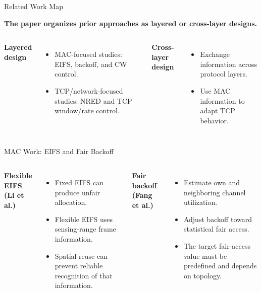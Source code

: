\ResearchStyle
{}

\begin{frame}{Related Work Map}
\begin{center}
\textbf{The paper organizes prior approaches as layered or cross-layer designs.}
\end{center}

\begin{columns}[T,onlytextwidth]
\textbf{Layered design}
\begin{itemize}
\item MAC-focused studies: EIFS, backoff, and CW control.
\item TCP/network-focused studies: NRED and TCP window/rate control.
\end{itemize}
\textbf{Cross-layer design}
\begin{itemize}
\item Exchange information across protocol layers.
\item Use MAC information to adapt TCP behavior.
\end{itemize}
\end{columns}

\vspace{0.25cm}
\end{frame}

\begin{frame}{MAC Work: EIFS and Fair Backoff}
\begin{columns}[T,onlytextwidth]
\textbf{Flexible EIFS (Li et al.)}
\begin{itemize}
\item Fixed EIFS can produce unfair allocation.
\item Flexible EIFS uses sensing-range frame information.
\item Spatial reuse can prevent reliable recognition of that information.
\end{itemize}
\textbf{Fair backoff (Fang et al.)}
\begin{itemize}
\item Estimate own and neighboring channel utilization.
\item Adjust backoff toward statistical fair access.
\item The target fair-access value must be predefined and depends on topology.
\end{itemize}
\end{columns}
\end{frame}

